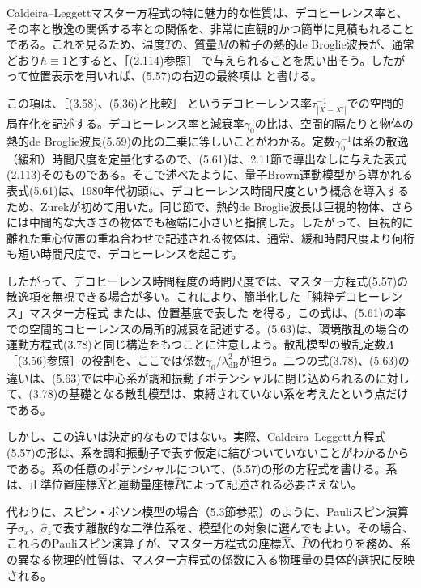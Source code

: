 Caldeira--Leggettマスター方程式の特に魅力的な性質は、デコヒーレンス率と、その率と散逸の関係する率との関係を、非常に直観的かつ簡単に見積もれることである。これを見るため、温度$T$の、質量$M$の粒子の熱的de Broglie波長が、通常どおり$\hbar\equiv1$とすると、［(2.114)参照］
で与えられることを思い出そう。したがって位置表示を用いれば、(5.57)の右辺の最終項は
と書ける。

\hypertarget{srcpage:193}{}\label{srcpage:193}
この項は、［(3.58)、(5.36)と比較］
というデコヒーレンス率$\tau_{|X-X'|}^{-1}$での空間的局在化を記述する。デコヒーレンス率と減衰率$\gamma_0$の比は、空間的隔たりと物体の熱的de Broglie波長(5.59)の比の二乗に等しいことがわかる。定数$\gamma_0^{-1}$は系の散逸（緩和）時間尺度を定量化するので、(5.61)は、2.11節で導出なしに与えた表式(2.113)そのものである。そこで述べたように、量子Brown運動模型から導かれる表式(5.61)は、1980年代初頭に、デコヒーレンス時間尺度という概念を導入するため、Zurekが初めて用いた\cite{ref012}。同じ節で、熱的de Broglie波長は巨視的物体、さらには中間的な大きさの物体でも極端に小さいと指摘した。したがって、巨視的に離れた重心位置の重ね合わせで記述される物体は、通常、緩和時間尺度より何桁も短い時間尺度で、デコヒーレンスを起こす。

したがって、デコヒーレンス時間程度の時間尺度では、マスター方程式(5.57)の散逸項を無視できる場合が多い。これにより、簡単化した「純粋デコヒーレンス」マスター方程式
または、位置基底で表した
を得る。この式は、(5.61)の率での空間的コヒーレンスの局所的減衰を記述する。(5.63)は、環境散乱の場合の運動方程式(3.78)と同じ構造をもつことに注意しよう。散乱模型の散乱定数$\Lambda$［(3.56)参照］の役割を、ここでは係数$\gamma_0/\lambda_{\mathrm{dB}}^2$が担う。二つの式(3.78)、(5.63)の違いは、(5.63)では中心系が調和振動子ポテンシャルに閉じ込められるのに対して、(3.78)の基礎となる散乱模型は、束縛されていない系を考えたという点だけである。

しかし、この違いは決定的なものではない。実際、Caldeira--Leggett方程式(5.57)の形は、系を調和振動子で表す仮定に結びついていないことがわかるからである。系の任意のポテンシャルについて、(5.57)の形の方程式を書ける。系は、正準位置座標$\hat X$と運動量座標$\hat P$によって記述される必要さえない。

\hypertarget{srcpage:194}{}\label{srcpage:194}
代わりに、スピン・ボソン模型の場合（5.3節参照）のように、Pauliスピン演算子$\hat\sigma_x$、$\hat\sigma_z$で表す離散的な二準位系を、模型化の対象に選んでもよい。その場合、これらのPauliスピン演算子が、マスター方程式の座標$\hat X$、$\hat P$の代わりを務め、系の異なる物理的性質は、マスター方程式の係数に入る物理量の具体的選択に反映される。
